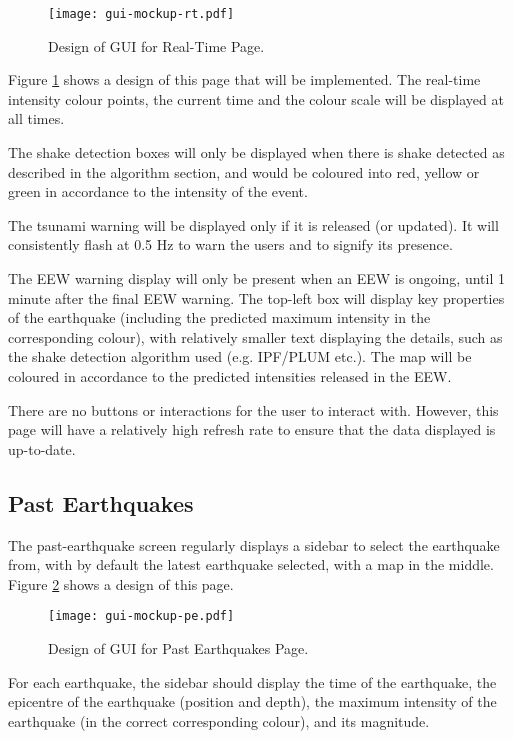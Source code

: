 \begin{figure}[!ht]
    \centering
    \texttt{[image: gui-mockup-rt.pdf]}
    \caption{Design of GUI for Real-Time Page.}
    \label{fig:gui-mockup-rt}
\end{figure}

Figure \ref{fig:gui-mockup-rt} shows a design of this page that will be implemented. The real-time intensity colour points, the current time and the colour scale will be displayed at all times.

The shake detection boxes will only be displayed when there is shake detected as described in the algorithm section, and would be coloured into red, yellow or green in accordance to the intensity of the event.

The tsunami warning will be displayed only if it is released (or updated). It will consistently flash at 0.5 Hz to warn the users and to signify its presence.

The EEW warning display will only be present when an EEW is ongoing, until 1 minute after the final EEW warning. The top-left box will display key properties of the earthquake (including the predicted maximum intensity in the corresponding colour), with relatively smaller text displaying the details, such as the shake detection algorithm used (e.g. IPF/PLUM etc.). The map will be coloured in accordance to the predicted intensities released in the EEW.

There are no buttons or interactions for the user to interact with. However, this page will have a relatively high refresh rate to ensure that the data displayed is up-to-date.

\subsection{Past Earthquakes}

The past-earthquake screen regularly displays a sidebar to select the earthquake from, with by default the latest earthquake selected, with a map in the middle. Figure \ref{fig:gui-mockup-pe} shows a design of this page.

\begin{figure}[!ht]
    \centering
    \texttt{[image: gui-mockup-pe.pdf]}
    \caption{Design of GUI for Past Earthquakes Page.}
    \label{fig:gui-mockup-pe}
\end{figure}

For each earthquake, the sidebar should display the time of the earthquake, the epicentre of the earthquake (position and depth), the maximum intensity of the earthquake (in the correct corresponding colour), and its magnitude.

